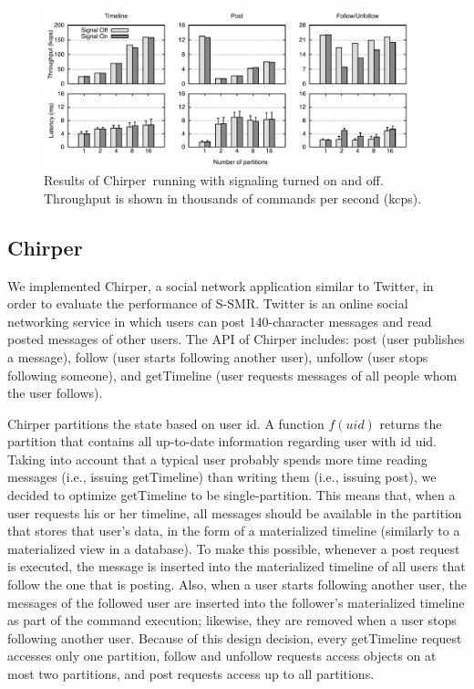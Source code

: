 \documentclass[11pt]{article}
\newcommand{\ssmr}{\mbox{S-SMR}}
\newcommand{\appname}{Chirper} %
\begin{document}
\begin{figure}
\begin{minipage}[b]{1\linewidth} %
\centering
      \includegraphics[width=1\linewidth]{figures/sc-at-scale-locality}
\end{minipage}
\caption{Results of \appname\ running with signaling turned on and off. Throughput is shown in thousands of commands per second (kcps).}
\label{fig:perf}
\end{figure}

\subsection{\appname}
We implemented \appname{}, a social network application similar to Twitter, in order to evaluate the performance of \ssmr{}.
Twitter is an online social networking service in which users can post 140-character messages and read posted messages of other users.
The API of \appname{} includes: post (user publishes a message), follow (user starts following another user), unfollow (user stops following someone), and getTimeline (user requests messages of all people whom the user follows).

\appname{} partitions the state based on user id. A function $f(uid)$ returns the partition that contains all up-to-date information regarding user with id uid. Taking into account that a typical user probably spends more time reading messages (i.e., issuing getTimeline) than writing them (i.e., issuing post), we decided to optimize getTimeline to be single-partition. This means that, when a user requests his or her timeline, all messages should be available in the partition that stores that user's data, in the form of a materialized timeline (similarly to a materialized view in a database). To make this possible, whenever a post request is executed, the message is inserted into the materialized timeline of all users that follow the one that is posting. Also, when a user starts following another user, the messages of the followed user are inserted into the follower's materialized timeline as part of the command execution; likewise, they are removed when a user stops following another user. Because of this design decision, every getTimeline request accesses only one partition, follow and unfollow requests access objects on at most two partitions, and post requests access up to all partitions.
\end{document}
